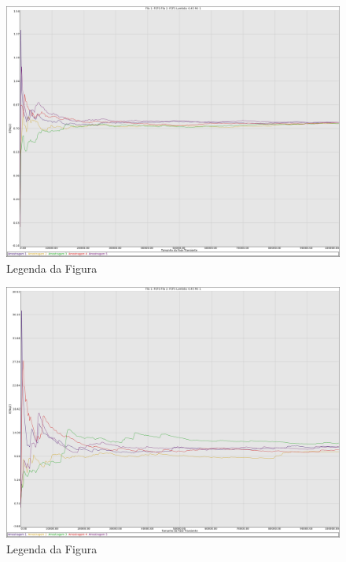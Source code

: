 \documentclass[a4paper,10pt]{article}
\begin{document}
\begin{figure}
	\caption{Legenda da Figura}
	\label{figTransienteFCFSfila1Nq}
	\includegraphics[scale = 0.2]{./graficos_transiente_1/FCFS/03.png}
\end{figure}

\begin{figure}
	\caption{Legenda da Figura}
	\label{figTransienteFCFSfila2Nq}
	\includegraphics[scale = 0.2]{./graficos_transiente_1/FCFS/04.png}
\end{figure}
\end{document}
